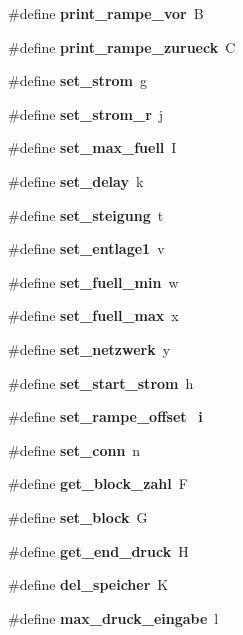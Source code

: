 \begin{DoxyCompactItemize}
\item 
\#define \textbf{ print\+\_\+rampe\+\_\+vor}~\textquotesingle{}B\textquotesingle{}
\item 
\#define \textbf{ print\+\_\+rampe\+\_\+zurueck}~\textquotesingle{}C\textquotesingle{}
\item 
\#define \textbf{ set\+\_\+strom}~\textquotesingle{}g\textquotesingle{}
\item 
\#define \textbf{ set\+\_\+strom\+\_\+r}~\textquotesingle{}j\textquotesingle{}
\item 
\#define \textbf{ set\+\_\+max\+\_\+fuell}~\textquotesingle{}I\textquotesingle{}
\item 
\#define \textbf{ set\+\_\+delay}~\textquotesingle{}k\textquotesingle{}
\item 
\#define \textbf{ set\+\_\+steigung}~\textquotesingle{}t\textquotesingle{}
\item 
\#define \textbf{ set\+\_\+entlage1}~\textquotesingle{}v\textquotesingle{}
\item 
\#define \textbf{ set\+\_\+fuell\+\_\+min}~\textquotesingle{}w\textquotesingle{}
\item 
\#define \textbf{ set\+\_\+fuell\+\_\+max}~\textquotesingle{}x\textquotesingle{}
\item 
\#define \textbf{ set\+\_\+netzwerk}~\textquotesingle{}y\textquotesingle{}
\item 
\#define \textbf{ set\+\_\+start\+\_\+strom}~\textquotesingle{}h\textquotesingle{}
\item 
\#define \textbf{ set\+\_\+rampe\+\_\+offset}~\textquotesingle{}\textbf{ i}\textquotesingle{}
\item 
\#define \textbf{ set\+\_\+conn}~\textquotesingle{}n\textquotesingle{}
\item 
\#define \textbf{ get\+\_\+block\+\_\+zahl}~\textquotesingle{}F\textquotesingle{}
\item 
\#define \textbf{ set\+\_\+block}~\textquotesingle{}G\textquotesingle{}
\item 
\#define \textbf{ get\+\_\+end\+\_\+druck}~\textquotesingle{}H\textquotesingle{}
\item 
\#define \textbf{ del\+\_\+speicher}~\textquotesingle{}K\textquotesingle{}
\item 
\#define \textbf{ max\+\_\+druck\+\_\+eingabe}~\textquotesingle{}l\textquotesingle{}
\end{DoxyCompactItemize}
